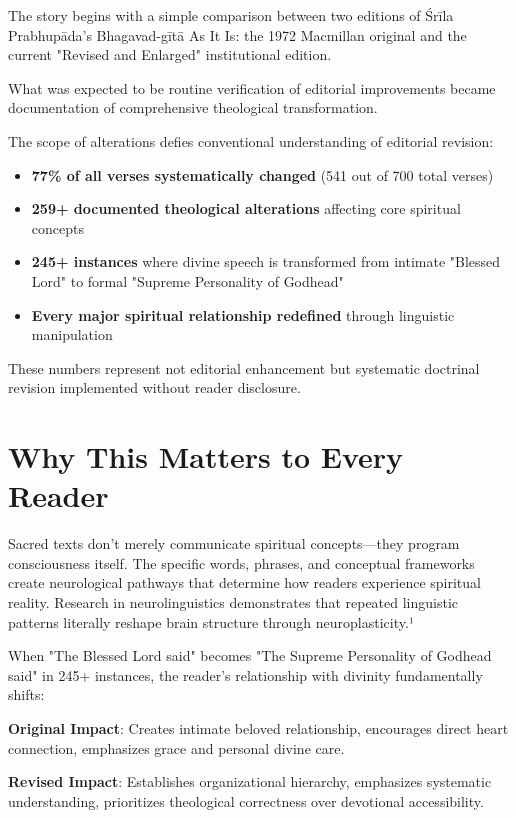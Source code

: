 \documentclass[11pt,twoside]{book}
\begin{document}
The story begins with a simple comparison between two editions of Śrīla Prabhupāda's Bhagavad-gītā As It Is: the 1972 Macmillan original and the current "Revised and Enlarged" institutional edition. 

What was expected to be routine verification of editorial improvements became documentation of comprehensive theological transformation.

The scope of alterations defies conventional understanding of editorial revision:

\setlength{\leftmargini}{1em}
\begin{itemize}
\item \textbf{\textbf{77\% of all verses systematically changed}} (541 out of 700 total verses)
\item \textbf{\textbf{259+ documented theological alterations}} affecting core spiritual concepts
\item \textbf{\textbf{245+ instances}} where divine speech is transformed from intimate "Blessed Lord" to formal "Supreme Personality of Godhead"
\item \textbf{\textbf{Every major spiritual relationship redefined}} through linguistic manipulation
\end{itemize}

These numbers represent not editorial enhancement but systematic doctrinal revision implemented without reader disclosure.
\section*{Why This Matters to Every Reader}
\label{sec:org056ab68}

Sacred texts don't merely communicate spiritual concepts—they program consciousness itself. The specific words, phrases, and conceptual frameworks create neurological pathways that determine how readers experience spiritual reality. Research in neurolinguistics demonstrates that repeated linguistic patterns literally reshape brain structure through neuroplasticity.¹

When "The Blessed Lord said" becomes "The Supreme Personality of Godhead said" in 245+ instances, the reader's relationship with divinity fundamentally shifts:

\begin{pullquotebox}
\textbf{Original Impact}: Creates intimate beloved relationship, encourages direct heart connection, emphasizes grace and personal divine care.

\textbf{Revised Impact}: Establishes organizational hierarchy, emphasizes systematic understanding, prioritizes theological correctness over devotional accessibility.
\end{pullquotebox}
\end{document}

